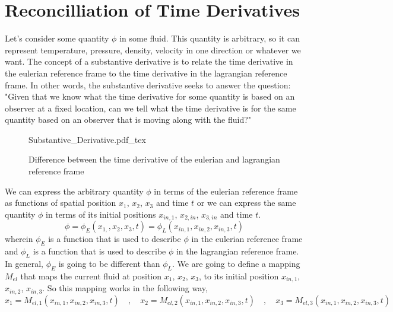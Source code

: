 \section{Reconcilliation of Time Derivatives}
\begin{comment}
\end{comment}
Let's consider some quantity $\phi$ in some fluid. 
This quantity is arbitrary, so it can represent temperature, pressure, density, velocity in one direction or whatever we want. 
The concept of a substantive derivative is to relate the time derivative in the eulerian reference frame to the time derivative in the lagrangian reference frame.
In other words, the substantive derivative seeks to answer the question: "Given that we know what the time derivative for some quantity is based on an observer at a fixed location, can we tell what the time derivative is for the same quantity based on an observer that is moving along with the fluid?"
\begin{figure}[H]\centering
\def\svgwidth{500px}
{Substantive_Derivative.pdf_tex}
\caption{Difference between the time derivative of the eulerian and lagrangian reference frame}
\label{eulerian-lagrangian reference frame derivative}
\end{figure}
We can express the arbitrary quantity $\phi$ in terms of the eulerian reference frame as functions of spatial position $x_{1}$, $x_{2}$, $x_{3}$ and time $t$ or we can express the same quantity $\phi$ in terms of its initial positions $x_{in,1}$, $x_{2,in}$, $x_{3,in}$ and time $t$.
\begin{equation}\phi = \phi_{E}(x_{1,},x_{2},x_{3},t) = \phi_{L}(x_{in,1},x_{in,2},x_{in,3},t) \label{Substantive Derivative Functional Representation}\end{equation}
wherein $\phi_{E}$ is a function that is used to describe $\phi$ in the eulerian reference frame and $\phi_{L}$ is a function that is used to describe $\phi$ in the lagrangian reference frame.
In general, $\phi_{E}$ is going to be different than $\phi_{L}$.
We are going to define a mapping $M_{el}$ that maps the current fluid at position $x_{1}$, $x_{2}$, $x_{3}$, to its initial position $x_{in,1}$, $x_{in,2}$, $x_{in,3}$.
So this mapping works in the following way,
\begin{equation}x_{1} = M_{el,1}(x_{in,1}, x_{in,2}, x_{in,3}, t) \quad,\quad x_{2} = M_{el,2}(x_{in,1}, x_{in,2}, x_{in,3}, t) \quad,\quad x_{3} = M_{el,3}(x_{in,1}, x_{in,2}, x_{in,3}, t) \label{Definition of Lagrangian to Euler Reference Frame Mapping}\end{equation}
